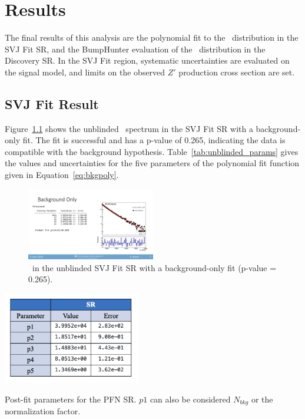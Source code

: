 \chapter{Results}
\label{ch:results}
The final results of this analysis are the polynomial fit to the \mt~distribution in the SVJ Fit SR, and the BumpHunter evaluation of the \mt~distribution in the Discovery SR. In the SVJ Fit region, systematic uncertainties are evaluated on the signal model, and limits on the observed $Z'$ production cross section are set. 

\section{SVJ Fit Result}
\label{sec:results_svj}
Figure~\ref{fig:unblinded_PFN_bonly} shows the unblinded \mt~spectrum in the SVJ Fit SR with a background-only fit. 
The fit is successful and has a p-value of 0.265, indicating the data is compatible with the background hypothesis. 
Table~\ref{tab:unblinded_params} gives the values and uncertainties for the five parameters of the polynomial fit function given in Equation~\ref{eq:bkgpoly}. 
\begin{figure}[!htbp]
\centering
   \includegraphics[width=0.5\textwidth]{figures/results/unblinded_PFN_bonly}
    \caption{\mt~in the unblinded SVJ Fit SR with a background-only fit (p-value = 0.265).
    \label{fig:unblinded_PFN_bonly}}
\end{figure}

\begin{table}[!htbp]
\centering
   \includegraphics[width=0.45\textwidth]{figures/results/postfit_param_pfnSR}
    \caption{Post-fit parameters for the PFN SR. $p1$ can also be considered $N_{bkg}$ or the normalization factor.
    \label{tab:unblinded_params}}
\end{table}

